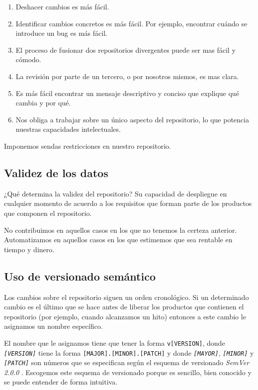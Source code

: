 \begin{enumerate}
    \item Deshacer cambios es más fácil.
    \item Identificar cambios concretos es más fácil. Por ejemplo, encontrar cuándo se introduce un bug
           es más fácil.
    \item El proceso de fusionar dos repositorios divergentes puede ser mas fácil y cómodo.
    \item La revisión por parte de un tercero, o por nosotros mismos, es mas clara.
    \item Es más fácil encontrar un mensaje descriptivo y conciso que explique qué cambia y por qué.
    \item Nos obliga a trabajar sobre un único aspecto del repositorio, lo que potencia nuestras
          capacidades intelectuales.
\end{enumerate}

Imponemos sendas restricciones en nuestro repositorio.

\subsection{Validez de los datos}

¿Qué determina la validez del repositorio? Su capacidad de despliegue en cualquier
momento de acuerdo a los requisitos que forman parte de los productos que componen
el repositorio.

No contribuimos en aquellos casos en los que no tenemos la certeza anterior.
Automatizamos en aquellos casos en los que estimemos que sea rentable en tiempo
y dinero.

\subsection{Uso de versionado semántico}

Los cambios sobre el repositorio siguen un orden cronológico.
Si un determinado cambio es el último que se hace antes de
liberar los productos que contienen el repositorio (por ejemplo,
cuando alcanzamos un hito) entonces a este cambio le asignamos
un nombre específico.

El nombre que le asignamos tiene que tener la forma \texttt{v[VERSION]},
donde \textit{\texttt{[VERSION]}} tiene la forma \texttt{[MAJOR].[MINOR].[PATCH]} y donde
\textit{\texttt{[MAYOR]}}, \textit{\texttt{[MINOR]}} y \textit{\texttt{[PATCH]}} son números que se
especifican según el esquema de versionado \textit{SemVer 2.0.0} \cite{SemVer}.
Escogemos este esquema de versionado porque es sencillo, bien conocido y se puede
entender de forma intuitiva.

